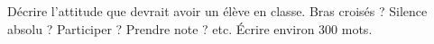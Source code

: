 
\begin{exercice}\label{exosmath-0425}

    Décrire l'attitude que devrait avoir un élève en classe. Bras croisés ? Silence absolu ? Participer ? Prendre note ? etc. Écrire environ 300 mots.

\end{exercice}
